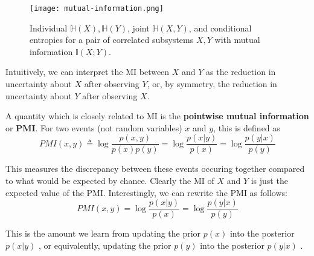 \begin{figure}[hbtp]
\centering
    \texttt{[image: mutual-information.png]}
\caption{Individual $\mathbb{H}(X),\mathbb{H}(Y)$, joint $\mathbb{H}(X,Y)$, and conditional entropies for a pair of correlated subsystems $X,Y$ with mutual information $\mathbb{I}(X;Y)$.}
\label{fig:mi} 
\end{figure}

Intuitively, we can interpret the MI between $X$ and $Y$ as the reduction in uncertainty about $X$ after observing $Y$, or, by symmetry, the reduction in uncertainty about $Y$ after observing $X$.

A quantity which is closely related to MI is the \textbf{pointwise mutual information} or \textbf{PMI}. For two events (not random variables) $x$ and $y$, this is defined as
\begin{equation}
PMI(x,y) \triangleq \log\dfrac{p(x,y)}{p(x)p(y)}=\log\dfrac{p(x|y)}{p(x)}=\log\dfrac{p(y|x)}{p(y)}
\end{equation}

This measures the discrepancy between these events occuring together compared to what would be expected by chance. Clearly the MI of $X$ and $Y$ is just the expected value of the PMI. Interestingly, we can rewrite the PMI as follows:
\begin{equation}
PMI(x,y)=\log\dfrac{p(x|y)}{p(x)}=\log\dfrac{p(y|x)}{p(y)}
\end{equation}

This is the amount we learn from updating the prior $p(x)$ into the posterior $p(x|y)$ , or equivalently, updating the prior $p(y)$ into the posterior $p(y |x)$ .